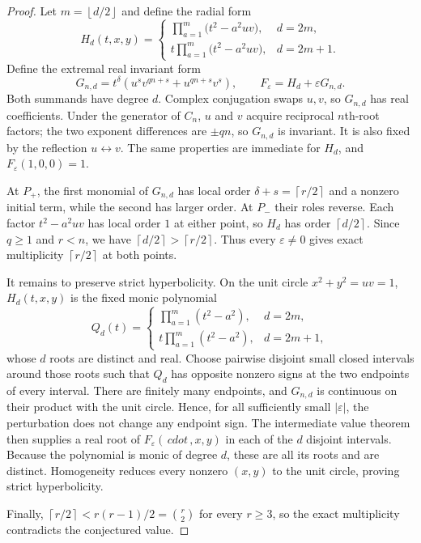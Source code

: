 \documentclass[11pt]{article}
\newcommand{\ceil}[1]{\left\lceil #1\right\rceil}
\newcommand{\floor}[1]{\left\lfloor #1\right\rfloor}
\begin{document}
\begin{proof}
Let $m=\floor{d/2}$ and define the radial form
\[
 H_d(t,x,y)=
 \begin{cases}
 \displaystyle\prod_{a=1}^{m}\bigl(t^2-a^2uv\bigr),&d=2m,\\[6pt]
 \displaystyle t\prod_{a=1}^{m}\bigl(t^2-a^2uv\bigr),&d=2m+1.
 \end{cases}
\]
Define the extremal real invariant form
\[
 G_{n,d}=t^\delta
 \left(u^s v^{qn+s}+u^{qn+s}v^s\right),
 \qquad F_\varepsilon=H_d+\varepsilon G_{n,d}.
\]
Both summands have degree $d$.  Complex conjugation swaps $u,v$, so
$G_{n,d}$ has real coefficients.  Under the generator of $C_n$, $u$ and $v$
acquire reciprocal $n$th-root factors; the two exponent differences are
$\pm qn$, so $G_{n,d}$ is invariant.  It is also fixed by the reflection
$u\leftrightarrow v$.  The same properties are immediate for $H_d$, and
$F_\varepsilon(1,0,0)=1$.

At $P_+$, the first monomial of $G_{n,d}$ has local order
$\delta+s=\ceil{r/2}$ and a nonzero initial term, while the second has larger
order.  At $P_-$ their roles reverse.  Each factor
$t^2-a^2uv$ has local order $1$ at either point, so $H_d$ has order
$\ceil{d/2}$.  Since $q\geq1$ and $r<n$, we have
$\ceil{d/2}>\ceil{r/2}$.  Thus every $\varepsilon\ne0$ gives exact
multiplicity $\ceil{r/2}$ at both points.

It remains to preserve strict hyperbolicity.  On the unit circle
$x^2+y^2=uv=1$, $H_d(t,x,y)$ is the fixed monic polynomial
\[
 Q_d(t)=
 \begin{cases}
 \prod_{a=1}^{m}(t^2-a^2),&d=2m,\\
 t\prod_{a=1}^{m}(t^2-a^2),&d=2m+1,
 \end{cases}
\]
whose $d$ roots are distinct and real.  Choose pairwise disjoint small closed
intervals around those roots such that $Q_d$ has opposite nonzero signs at
the two endpoints of every interval.  There are finitely many endpoints,
and $G_{n,d}$ is continuous on their product with the unit circle.  Hence,
for all sufficiently small $|\varepsilon|$, the perturbation does not change
any endpoint sign.  The intermediate value theorem then supplies a real root
of $F_\varepsilon(\,cdot\,,x,y)$ in each of the $d$ disjoint intervals.
Because the polynomial is monic of degree $d$, these are all its roots and
are distinct.  Homogeneity reduces every nonzero $(x,y)$ to the unit circle,
proving strict hyperbolicity.

Finally, $\ceil{r/2}<r(r-1)/2=\binom r2$ for every $r\geq3$, so the exact
multiplicity contradicts the conjectured value.
\end{proof}
\end{document}
